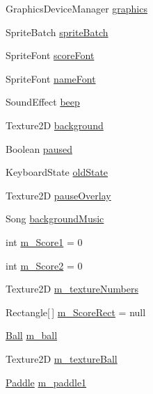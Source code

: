 \begin{DoxyCompactItemize}
\item 
Graphics\-Device\-Manager \hyperlink{class_ping___pong_1_1_game1_aaaff77331c3e33fc32f14a28fa530a7d}{graphics}
\item 
Sprite\-Batch \hyperlink{class_ping___pong_1_1_game1_a887077461615a43e27f62c978affad96}{sprite\-Batch}
\item 
Sprite\-Font \hyperlink{class_ping___pong_1_1_game1_adcc5e0fb3bc88b1ea3ae2c4c1a06a936}{score\-Font}
\item 
Sprite\-Font \hyperlink{class_ping___pong_1_1_game1_a1f794b8a0feab9dfdbf4c98dc86222cf}{name\-Font}
\item 
Sound\-Effect \hyperlink{class_ping___pong_1_1_game1_aaa0f5f32149b8eb6abd8c148a4e47c36}{beep}
\item 
Texture2\-D \hyperlink{class_ping___pong_1_1_game1_ae0f525562a3eb615b556f4a9a1eda3e7}{background}
\item 
Boolean \hyperlink{class_ping___pong_1_1_game1_a87f945d8a88fa041a94fe15c1446173e}{paused}
\item 
Keyboard\-State \hyperlink{class_ping___pong_1_1_game1_a13ba97510380dfbf6c00815f4d5af7ad}{old\-State}
\item 
Texture2\-D \hyperlink{class_ping___pong_1_1_game1_a2ef093c4cac7c244c30664dacecc7aa2}{pause\-Overlay}
\item 
Song \hyperlink{class_ping___pong_1_1_game1_ab6439b5c8bcfb4ba77f2a62ab4c73213}{background\-Music}
\item 
int \hyperlink{class_ping___pong_1_1_game1_a79cc64d39546f15bb7c9d169e5482444}{m\-\_\-\-Score1} = 0
\item 
int \hyperlink{class_ping___pong_1_1_game1_ad54e91077ec0e426c351258e17fb2137}{m\-\_\-\-Score2} = 0
\item 
Texture2\-D \hyperlink{class_ping___pong_1_1_game1_a7919de4eb9687284ff736962adc6d180}{m\-\_\-texture\-Numbers}
\item 
Rectangle\mbox{[}$\,$\mbox{]} \hyperlink{class_ping___pong_1_1_game1_a97f485fbb53d7daba3590705a5129e60}{m\-\_\-\-Score\-Rect} = null
\item 
\hyperlink{class_ping___pong_1_1_ball}{Ball} \hyperlink{class_ping___pong_1_1_game1_a3da763dfe56d5444101a2a3c2ea97389}{m\-\_\-ball}
\item 
Texture2\-D \hyperlink{class_ping___pong_1_1_game1_aeb0aebe72aa99d1d627260de5d1beafb}{m\-\_\-texture\-Ball}
\item 
\hyperlink{class_ping___pong_1_1_paddle}{Paddle} \hyperlink{class_ping___pong_1_1_game1_ac47e2989a6e169d42af4366f901c3d8a}{m\-\_\-paddle1}

\end{DoxyCompactItemize}
